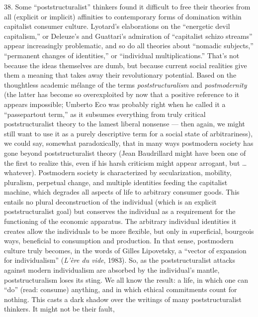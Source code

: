 {    38. Some “poststructuralist” thinkers found it difficult to free their
    theories from all (explicit or implicit) affinities to contemporary forms of
    domination within capitalist consumer culture. Lyotard’s elaborations on the
    “energetic devil capitalism,” or Deleuze’s and Guattari’s admiration of
    “capitalist schizo streams” appear increasingly problematic, and so do all
    theories about “nomadic subjects,” “permanent changes of identities,” or
    “individual multiplications.” That’s not because the ideas themselves are
    dumb, but because current social realities give them a meaning that takes
    away their revolutionary potential. Based on the thoughtless academic
    mélange of the terms \textit{poststructuralism} and \textit{postmodernity}
    (the latter has become so overexploited by now that a positive reference to
    it appears impossible; Umberto Eco was probably right when he called it a
    “passepartout term,” as it subsumes everything from truly critical
    poststructuralist theory to the lamest liberal nonsense — then again, we
    might still want to use it as a purely descriptive term for a social state
    of arbitrariness), we could say, somewhat paradoxically, that in many ways
    postmodern society has gone beyond poststructuralist theory (Jean
    Baudrillard might have been one of the first to realize this, even if his
    harsh criticism might appear arrogant, but … whatever). Postmodern society
    is characterized by secularization, mobility, pluralism, perpetual change,
    and multiple identities feeding the capitalist machine, which degrades all
    aspects of life to arbitrary consumer goods. This entails no plural
    deconstruction of the individual (which is an explicit poststructuralist
    goal) but conserves the individual as a requirement for the functioning of
    the economic apparatus. The arbitrary individual identities it creates allow
    the individuals to be more flexible, but only in superficial, bourgeois
    ways, beneficial to consumption and production. In that sense, postmodern
    culture truly becomes, in the words of Gilles Lipovetsky, a “vector of
    expansion for individualism” (\textit{L’ère du vide}, 1983). So, as the
    poststructuralist attacks against modern individualism are absorbed by the
    individual’s mantle, poststructuralism loses its sting. We all know the
    result: a life, in which one can “do” (read: consume) anything, and in which
    ethical commitments count for nothing. This casts a dark shadow over the
    writings of many poststructuralist thinkers. It might not be their fault,
}
